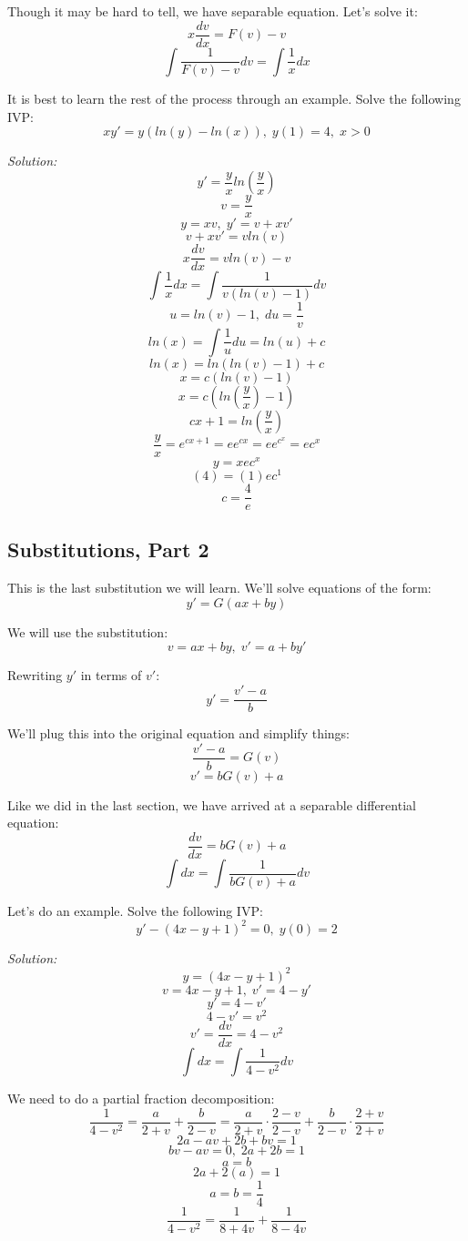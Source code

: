 Though it may be hard to tell, we have separable equation. Let's solve it:
$$x\frac{dv}{dx} = F(v) - v$$
$$\int \frac{1}{F(v) - v}dv = \int \frac{1}{x}dx$$

It is best to learn the rest of the process through an example. Solve the following IVP:
$$xy' = y(ln(y) - ln(x)),\; y(1) = 4,\; x > 0$$

\textit{Solution:}
$$y' = \frac{y}{x}ln\left(\frac{y}{x}\right)$$
$$v = \frac{y}{x}$$
$$y = xv,\; y' = v + xv'$$
$$v + xv' = vln(v)$$
$$x\frac{dv}{dx} = vln(v) - v$$
$$\int \frac{1}{x}dx = \int \frac{1}{v(ln(v) - 1)}dv$$
$$u = ln(v) - 1,\; du = \frac{1}{v}$$
$$ln(x) = \int \frac{1}{u}du = ln(u) + c$$
$$ln(x) = ln(ln(v) - 1) + c$$
$$x = c(ln(v) - 1)$$
$$x = c\left(ln\left(\frac{y}{x}\right) - 1\right)$$
$$cx + 1 = ln\left(\frac{y}{x}\right)$$
$$\frac{y}{x} = e^{cx + 1} = ee^{cx} = ee^{c^{x}} = ec^{x}$$
$$y = xec^{x}$$
$$(4) = (1)ec^{1}$$
$$c = \frac{4}{e}$$
\begin{center}
\end{center}

\pagebreak

\subsection{Substitutions, Part 2}
This is the last substitution we will learn. We'll solve equations of the form:
$$y' = G(ax + by)$$

We will use the substitution:
$$v = ax + by,\; v' = a + by'$$

Rewriting $y'$ in terms of $v'$:
$$y' = \frac{v' - a}{b}$$

We'll plug this into the original equation and simplify things:
$$\frac{v' - a}{b} = G(v)$$
$$v' = bG(v) + a$$

Like we did in the last section, we have arrived at a separable differential equation:
$$\frac{dv}{dx} = bG(v) + a$$
$$\int dx = \int \frac{1}{bG(v) + a}dv$$

Let's do an example. Solve the following IVP:
$$y' - (4x - y + 1)^{2} = 0,\; y(0) = 2$$

\textit{Solution:}
$$y = (4x - y + 1)^{2}$$
$$v = 4x - y + 1,\; v' = 4 - y'$$
$$y' = 4 - v'$$
$$4 - v' = v^{2}$$
$$v' = \frac{dv}{dx} = 4 - v^{2}$$
$$\int dx = \int \frac{1}{4 - v^{2}}dv$$

We need to do a partial fraction decomposition:
$$\frac{1}{4 - v^{2}} = \frac{a}{2 + v} + \frac{b}{2 - v} = \frac{a}{2 + v}\cdot\frac{2 - v}{2 - v} + \frac{b}{2 - v}\cdot\frac{2 + v}{2 + v}$$
$$2a - av + 2b + bv = 1$$
$$bv - av = 0,\; 2a + 2b = 1$$
$$a = b$$
$$2a + 2(a) = 1$$
$$a = b = \frac{1}{4}$$
$$\frac{1}{4 - v^{2}} = \frac{1}{8 + 4v} + \frac{1}{8 - 4v}$$

